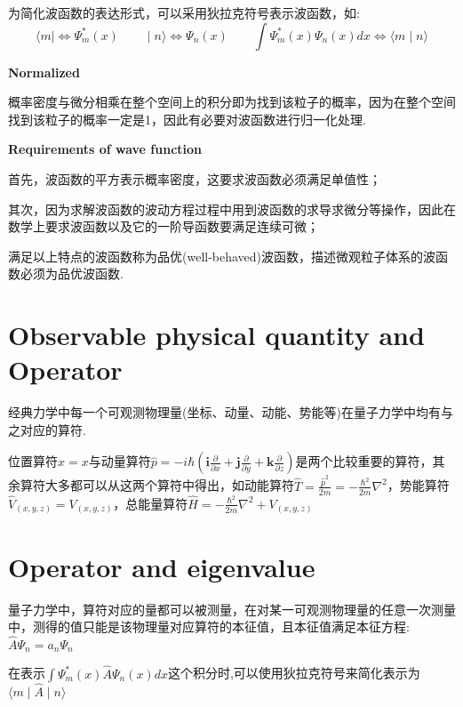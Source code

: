 \documentclass[28pt,openany]{book}
\begin{document}
为简化波函数的表达形式，可以采用狄拉克符号表示波函数，如:
$$\langle m \mid \Longleftrightarrow  \Psi_{m}^{*}(x)\textbf{ }\textbf{ }\textbf{ }\mid n \rangle \Longleftrightarrow  \Psi_{n}(x)\textbf{ }\textbf{ }\textbf{ }\int \Psi^{*}_{m}(x)\Psi_{n}(x)dx \Longleftrightarrow  \langle m \mid n \rangle$$

\textbf{ }

\textbf{Normalized}

概率密度与微分相乘在整个空间上的积分即为找到该粒子的概率，因为在整个空间找到该粒子的概率一定是1，因此有必要对波函数进行归一化处理.

\textbf{ }

\textbf{Requirements of wave function}

首先，波函数的平方表示概率密度，这要求波函数必须满足单值性；

其次，因为求解波函数的波动方程过程中用到波函数的求导求微分等操作，因此在数学上要求波函数以及它的一阶导函数要满足连续可微；

满足以上特点的波函数称为品优(well-behaved)波函数，描述微观粒子体系的波函数必须为品优波函数.

\section{Observable physical quantity and Operator}
\textbf{ }\textbf{ }
经典力学中每一个可观测物理量(坐标、动量、动能、势能等)在量子力学中均有与之对应的算符.

位置算符$\hat{x}=x$与动量算符$\hat{p}=-i\hbar(\textbf{i}\frac{\partial}{\partial x}+\textbf{j}\frac{\partial}{\partial y}+\textbf{k}\frac{\partial}{\partial z})$是两个比较重要的算符，其余算符大多都可以从这两个算符中得出，如动能算符$\hat{T}=\frac{\hat{p}^{2}}{2m}=-\frac{\hbar^{2}}{2m}\nabla^{2}$，势能算符$\hat{V}_{(x,y,z)}=V_{(x,y,z)}$，总能量算符$\hat{H}=-\frac{\hbar^{2}}{2m}\nabla^{2}+V_{(x,y,z)}$

\section{Operator and eigenvalue}
\textbf{ }\textbf{ }
量子力学中，算符对应的量都可以被测量，在对某一可观测物理量的任意一次测量中，测得的值只能是该物理量对应算符的本征值，且本征值满足本征方程:$\hat{A}\Psi_{n}=a_{n}\Psi_{n}$

在表示$\int \Psi_{m}^{*}(x)\hat{A}\Psi_{n}(x)dx$这个积分时,可以使用狄拉克符号来简化表示为$\langle m \mid \hat{A} \mid n \rangle$
\end{document}

